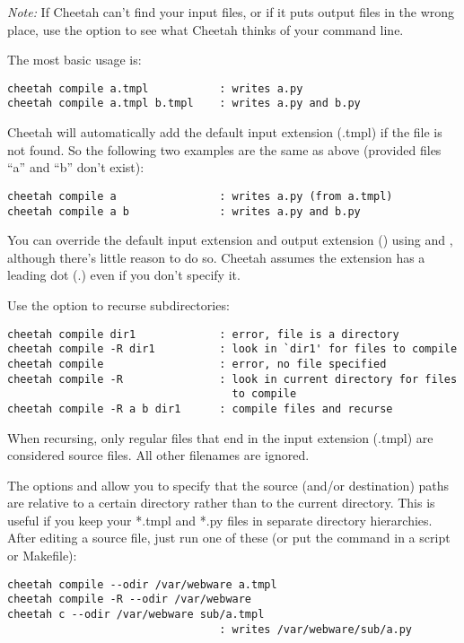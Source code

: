 {\em Note:} If Cheetah can't find your input files, or if it puts output files
in the wrong place, use the  option to see what Cheetah thinks 
of your command line.

The most basic usage is:
\begin{verbatim}
cheetah compile a.tmpl           : writes a.py
cheetah compile a.tmpl b.tmpl    : writes a.py and b.py
\end{verbatim}

Cheetah will automatically add the default input extension (.tmpl) if the
file is not found.  So the following two examples are the same as above
(provided files ``a'' and ``b'' don't exist):
\begin{verbatim}
cheetah compile a                : writes a.py (from a.tmpl)
cheetah compile a b              : writes a.py and b.py
\end{verbatim}

You can override the default input extension and output extension
() using  and , although there's
little reason to do so.  Cheetah assumes the extension has a leading dot
(.) even if you don't specify it.

Use the  option to recurse subdirectories:
\begin{verbatim}
cheetah compile dir1             : error, file is a directory
cheetah compile -R dir1          : look in `dir1' for files to compile
cheetah compile                  : error, no file specified
cheetah compile -R               : look in current directory for files
                                   to compile
cheetah compile -R a b dir1      : compile files and recurse
\end{verbatim}
When recursing, only regular files that end in the input extension (.tmpl) are
considered source files.  All other filenames are ignored.

The options  and  allow you to specify that
the source (and/or destination) paths are relative to a certain directory
rather than to the current directory.  This is useful if you keep your
*.tmpl and *.py files in separate directory hierarchies.  After editing a 
source file, just run one of these (or put the command in a script or 
Makefile):
\begin{verbatim}
cheetah compile --odir /var/webware a.tmpl
cheetah compile -R --odir /var/webware
cheetah c --odir /var/webware sub/a.tmpl
                                 : writes /var/webware/sub/a.py
\end{verbatim}

